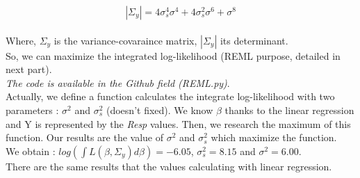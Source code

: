 \documentclass{article}
\begin{document}
\[|\Sigma_y| = 4\sigma_s^4\sigma^4+4\sigma_s^2\sigma^6+\sigma^8\]
\\
Where, $\Sigma_y$ is the variance-covaraince matrix, $|\Sigma_y|$ its determinant.\\
So, we can maximize the integrated log-likelihood (REML purpose, detailed in next part).\\
\textit{The code is available in the Github field (REML.py)}.\\
Actually, we define a function calculates the integrate log-likelihood with two parameters : $\sigma^2$ and $\sigma_s^2$ (doesn't fixed). We know $\beta$ thanks to the linear regression and Y is represented by the \textit{Resp} values. Then, we research the maximum of this function. Our results are the value of $\sigma^2$ and $\sigma_s^2$ which maximize the function.\\
We obtain : $log(\int L(\beta, \Sigma_y)d\beta)=-6.05$, $\sigma_s^2 = 8.15$ and $\sigma^2=6.00$. \\
There are the same results that the values calculating with linear regression.

\end{document}
